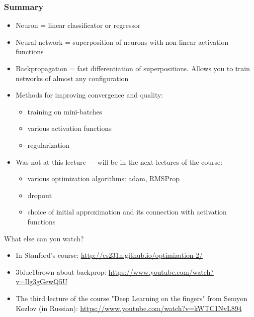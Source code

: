 \documentclass[fullscreen=true, bookmarks=true, hyperref={pdfencoding=unicode}]{beamer}
\begin{document}
\begin{frame}
  \frametitle{Summary}
  \begin{itemize}
      \pause
      \item Neuron = linear classificator or regressor
      \pause
      \item Neural network = superposition of neurons with non-linear activation functions
      \pause
      \item Backpropagation = fast differentiation of superpositions. Allows you to train networks of almost any configuration
      \pause
      \item Methods for improving convergence and quality:
      \begin{itemize}
          \item training on mini-batches
          \item various activation functions
          \item regularization
      \end{itemize}
      \pause
      \item Was not at this lecture — will be in the next lectures of the course:
      \begin{itemize}
          \item various optimization algorithms: adam, RMSProp
          \item dropout
          \item choice of initial approximation and its connection with activation functions
      \end{itemize}
  \end{itemize}
\end{frame}


\begin{frame}{What else can you watch?}
  \begin{itemize}
      \pause
      \item In Stanford's course: \href{http://cs231n.github.io/optimization-2/}{http://cs231n.github.io/optimization-2/}
      \pause
      \item 3blue1brown about backprop: \href{https://www.youtube.com/watch?v=Ilg3gGewQ5U}{https://www.youtube.com/watch?v=Ilg3gGewQ5U}
      \pause
      \item The third lecture of the course "Deep Learning on the fingers" from Semyon Kozlov (in Russian): \href{https://www.youtube.com/watch?v=kWTC1NvL894}{https://www.youtube.com/watch?v=kWTC1NvL894}
  \end{itemize}
\end{frame}
\end{document}
